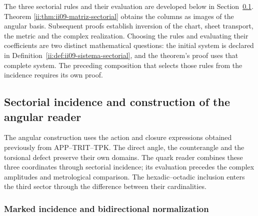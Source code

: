 \begin{remark}
The three sectorial rules and their evaluation are developed below in Section~\ref{ii:sec:ii09-construccion-sectorial}. Theorem \ref{ii:thm:ii09-matriz-sectorial} obtains the columns as images of the angular basis. Subsequent proofs establish inversion of the chart, sheet transport, the metric and the complex realization. Choosing the rules and evaluating their coefficients are two distinct mathematical questions: the initial system is declared in Definition~\ref{ii:def:ii09-sistema-sectorial}, and the theorem’s proof uses that complete system. The preceding composition that selects those rules from the incidence requires its own proof.
\end{remark}



\subsection{Sectorial incidence and construction of the angular reader}
\label{ii:sec:ii09-construccion-sectorial}

The angular construction uses the action and closure expressions obtained previously from APP--TRIT--TPK. The direct angle, the counterangle and the torsional defect preserve their own domains. The quark reader combines these three coordinates through sectorial incidence; its evaluation precedes the complex amplitudes and metrological comparison. The hexadic--octadic inclusion enters the third sector through the difference between their cardinalities.


\subsubsection{Marked incidence and bidirectional normalization}
\label{ii:sec:ii09-normalizacion-bidireccional}

